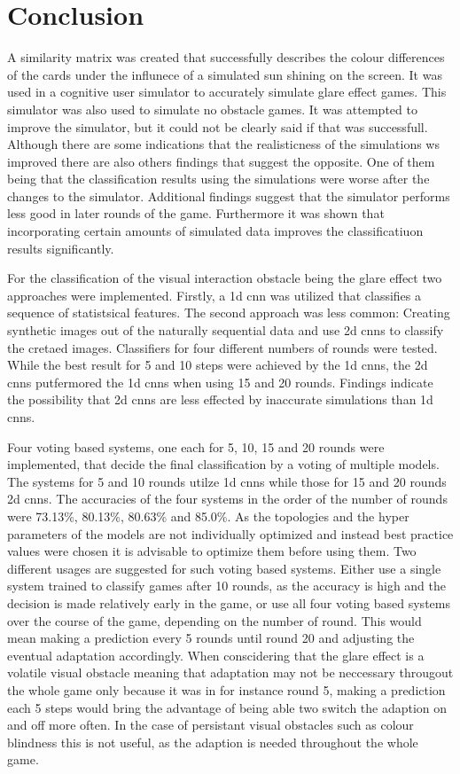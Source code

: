 \chapter{Conclusion}
\label{conclusion}
A similarity matrix was created that successfully describes the colour differences of the cards under the influnece of a simulated sun shining on the screen. It was used in a cognitive user simulator to accurately  simulate glare effect games. This simulator was also used to simulate no obstacle games. It was attempted to improve the simulator, but it could not be clearly said if that was successfull. Although there are some indications that the realisticness of the simulations ws improved there are also others  findings that suggest the opposite. One of them being that the classification results using the simulations were worse after the changes to the simulator. Additional findings suggest that the  simulator performs less good in later rounds of the game. Furthermore it was shown that incorporating certain amounts of simulated data improves the classificatiuon results significantly. 

For the classification of the visual interaction obstacle being the glare effect two approaches were implemented. Firstly, a 1d cnn was utilized that classifies a sequence of statistsical features. The second approach was less common: Creating synthetic images out of the naturally sequential data and use 2d cnns to classify the cretaed images. Classifiers for four different numbers of rounds were tested. While the best result for 5 and 10 steps were achieved by the 1d cnns, the 2d cnns putfermored the 1d cnns when using 15 and 20 rounds. Findings indicate the possibility that 2d cnns are less effected by inaccurate simulations than 1d cnns. 

Four voting based systems, one each for 5, 10, 15 and 20 rounds were implemented, that decide the final classification by a voting of multiple models. The systems for 5 and 10 rounds utilze 1d cnns while those for 15 and 20 rounds 2d cnns. The accuracies of the four systems in the order of the number of rounds were 73.13\%, 80.13\%, 80.63\% and 85.0\%. As the topologies and the hyper parameters of the models are not individually optimized and instead best practice values were chosen it is advisable to optimize them before using them. Two different usages are suggested for such voting based systems. Either use a single system trained to classify games after 10 rounds, as the accuracy is high and the decision is made relatively early in the game, or use all four voting based systems over the course of the game, depending on the number of round. This would mean making a prediction every 5 rounds until round 20 and adjusting the eventual adaptation accordingly. When conscidering that the glare effect is a volatile visual obstacle meaning that adaptation may not be neccessary througout the whole game only because it was in for instance round 5, making a prediction each 5 steps would bring the advantage of being able two switch the adaption on and off more often. In the case of persistant visual obstacles such as colour blindness this is not useful, as the adaption is needed throughout the whole game.

